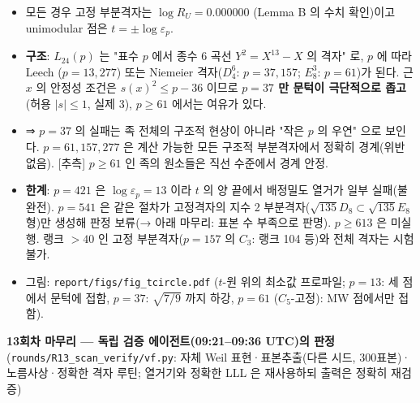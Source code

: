 \begin{itemize}
\tightlist
\item
  모든 경우 고정 부분격자는 \(\log R_U=0.000000\) (Lemma B 의 수치 확인)이고 unimodular 점은 \(t=\pm\log\varepsilon_p\).
\item
  \textbf{구조}: \(L_{24}(p)\) 는 "표수 \(p\) 에서 종수 6 곡선 \(Y^2=X^{13}-X\) 의 격자" 로, \(p\) 에 따라 Leech (\(p=13,277\)) 또는 Niemeier 격자(\(D_4^6\): \(p=37,157\); \(E_8^3\): \(p=61\))가 된다. 근 \(x\) 의 안정성 조건은 \(s(x)^2\le p-36\) 이므로 \textbf{\(p=37\) 만 문턱이 극단적으로 좁고}(허용 \(|s|\le1\), 실제 3), \(p\ge61\) 에서는 여유가 있다.
\item
  ⇒ \(p=37\) 의 실패는 족 전체의 구조적 현상이 아니라 "작은 \(p\) 의 우연" 으로 보인다. \(p=61,157,277\) 은 계산 가능한 모든 구조적 부분격자에서 정확히 경계(위반 없음). {[}추측{]} \(p\ge61\) 인 족의 원소들은 직선 수준에서 경계 안정.
\item
  \textbf{한계}: \(p=421\) 은 \(\log\varepsilon_p=13\) 이라 \(t\) 의 양 끝에서 배정밀도 열거가 일부 실패(불완전). \(p=541\) 은 같은 절차가 고정격자의 지수 2 부분격자(\(\sqrt{135}D_8\subset\sqrt{135}E_8\) 형)만 생성해 판정 보류(→ 아래 마무리: 표본 수 부족으로 판명). \(p\ge613\) 은 미실행. 랭크 \(>40\) 인 고정 부분격자(\(p=157\) 의 \(C_3\): 랭크 104 등)와 전체 격자는 시험 불가.
\item
  그림: \texttt{report/figs/fig\_tcircle.pdf} (\(t\)-원 위의 최소값 프로파일; \(p=13\): 세 점에서 문턱에 접함, \(p=37\): \(\sqrt{7/9}\) 까지 하강, \(p=61\) (\(C_5\)-고정): MW 점에서만 접함).
\end{itemize}

\textbf{13회차 마무리 --- 독립 검증 에이전트(09:21--09:36 UTC)의 판정} (\texttt{rounds/R13\_scan\_verify/vf.py}: 자체 Weil 표현·표본추출(다른 시드, 300표본)·노름사상·정확한 격자 루틴; 열거기와 정확한 LLL 은 재사용하되 출력은 정확히 재검증)

